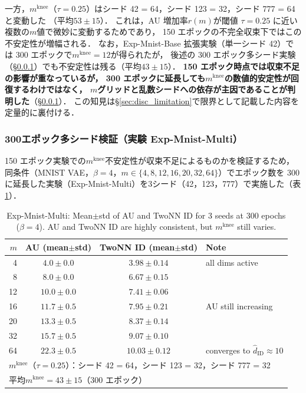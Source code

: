 \documentclass[11pt,a4paper]{jsarticle}
\newcommand{\mknee}{m^{\mathrm{knee}}}
\begin{document}
一方，$\mknee$（$\tau = 0.25$）はシード 42 = 64，シード 123 = 32，シード 777 = 64 と変動した
（平均$53 \pm 15$）．
これは，AU 増加率$r(m)$が閾値 $\tau = 0.25$ に近い複数の$m$値で微妙に変動するためであり，
150 エポックの不完全収束下ではこの不安定性が増幅される．
なお，Exp-Mnist-Base 拡張実験（単一シード 42）では 300 エポックで$\mknee = 12$が得られたが，
後述の 300 エポック多シード実験（§\ref{sec:exp_multiseed2}）でも不安定性は残る（平均$43 \pm 15$）．
\textbf{150 エポック時点では収束不足の影響が重なっているが，
300 エポックに延長しても$\mknee$の数値的安定性が回復するわけではなく，
$m$グリッドと乱数シードへの依存が主因であることが判明した}（§\ref{sec:exp_multiseed2}）．
この知見は§\ref{sec:disc_limitation}で限界として記載した内容を定量的に裏付ける．

\subsubsection{300エポック多シード検証（実験 Exp-Mnist-Multi）}\label{sec:exp_multiseed2}

150 エポック実験での$\mknee$不安定性が収束不足によるものかを検証するため，
同条件（MNIST VAE，$\beta = 4$，$m \in \{4, 8, 12, 16, 20, 32, 64\}$）でエポック数を
300 に延長した実験（Exp-Mnist-Multi）を3シード（42，123，777）で実施した（表\ref{tab:e4_300ep_multiseed}）．

\begin{table}[H]
\centering
\caption{Exp-Mnist-Multi: Mean$\pm$std of AU and TwoNN ID for 3 seeds at 300 epochs ($\beta=4$). AU and TwoNN ID are highly consistent, but $\mknee$ still varies.}
\label{tab:e4_300ep_multiseed}
\small
\begin{tabular}{rccl}
\toprule
$m$ & AU (mean$\pm$std) & TwoNN ID (mean$\pm$std) & Note \\
\midrule
 4 & $4.0 \pm 0.0$ & $3.98 \pm 0.14$ & all dims active \\
 8 & $8.0 \pm 0.0$ & $6.67 \pm 0.15$ & \\
12 & $10.0 \pm 0.0$ & $7.41 \pm 0.06$ & \\
16 & $11.7 \pm 0.5$ & $7.95 \pm 0.21$ & AU still increasing \\
20 & $13.3 \pm 0.5$ & $8.37 \pm 0.14$ & \\
32 & $15.7 \pm 0.5$ & $9.07 \pm 0.10$ & \\
64 & $22.3 \pm 0.5$ & $10.03 \pm 0.12$ & converges to $\hat{d}_\mathrm{ID} \approx 10$ \\
\midrule
\multicolumn{4}{l}{$\mknee$（$\tau=0.25$）：シード 42 = 64，シード 123 = 32，シード 777 = 32} \\
\multicolumn{4}{l}{平均$\mknee = 43 \pm 15$（300 エポック）} \\
\bottomrule
\end{tabular}
\end{table}
\end{document}
